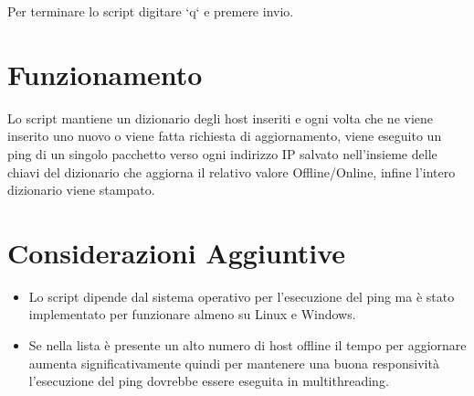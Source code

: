 \documentclass[a4paper,12pt]{report}
\begin{document}
Per terminare lo script digitare `q` e premere invio.

\section{Funzionamento}

Lo script mantiene un dizionario degli host inseriti e ogni volta che ne viene 
inserito uno nuovo o viene fatta richiesta di aggiornamento, viene eseguito un ping
di un singolo pacchetto verso ogni indirizzo IP salvato nell'insieme delle chiavi del
dizionario che aggiorna il relativo valore Offline/Online, infine l'intero dizionario 
viene stampato.

\section{Considerazioni Aggiuntive}

\begin{itemize}
	\item Lo script dipende dal sistema operativo per l'esecuzione del ping ma è stato implementato 
    per funzionare almeno su Linux e Windows.
	\item Se nella lista è presente un alto numero di host offline il tempo per aggiornare aumenta
    significativamente quindi per mantenere una buona responsività l'esecuzione del ping dovrebbe
    essere eseguita in multithreading.
\end{itemize}
\end{document}
